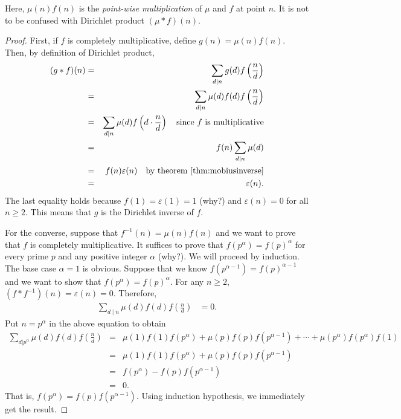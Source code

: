 \documentclass[12pt]{subfile}
\begin{document}
		\begin{note}
			Here, $\mu(n)f(n)$ is the \textit{point-wise multiplication} of $\mu$ and $f$ at point $n$. It is not to be confused with Dirichlet product $(\mu \ast f)(n)$.
		\end{note}

		\begin{proof}
			First, if $f$ is completely multiplicative, define $g(n) = \mu(n) f(n)$. Then, by definition of Dirichlet product,
				\begin{eqnarray*}
					(g \ast f)(n) &=& \sum_{d\mid n} g(d) f\left(\frac{n}{d}\right)\\
								  &=& \sum_{d\mid n} \mu(d) f(d) f\left(\frac{n}{d}\right)\\
								  &=& \sum_{d\mid n} \mu(d) f\left(d \cdot \frac{n}{d}\right) \quad \text{since } f \text{ is multiplicative}\\
								  &=& f(n) \sum_{d\mid n} \mu(d)\\
								  &=& f(n) \varepsilon(n) \quad \text{by theorem \ref{thm:mobiusinverse}}\\
								  &=& \varepsilon(n).
				\end{eqnarray*}
			The last equality holds because $f(1)=\varepsilon(1)=1$ (why?) and $\varepsilon(n)=0$ for all $n \geq 2$. This means that $g$ is the Dirichlet inverse of $f$.

			For the converse, suppose that $f^{-1}(n) = \mu(n) f(n)$ and we want to prove that $f$ is completely multiplicative. It suffices to prove that $f(p^\alpha)=f(p)^\alpha$ for every prime $p$ and any positive integer $\alpha$ (why?). We will proceed by induction. The base case $\alpha =1$ is obvious. Suppose that we know $f(p^{\alpha-1})=f(p)^{\alpha-1}$ and we want to show that $f(p^\alpha)=f(p)^\alpha$. For any $n \geq 2$, $(f\ast f^{-1})(n)=\varepsilon(n)=0$. Therefore,
				\begin{align*}
					\sum_{d\mid n} \mu(d) f(d) f\left(\frac{n}{d}\right) &= 0.
				\end{align*}
			Put $n=p^\alpha$ in the above equation to obtain
				\begin{eqnarray*}
					\sum_{d|p^\alpha} \mu(d) f(d) f\left(\frac{n}{d}\right)
						&=& \mu(1)f(1)f(p^\alpha) + \mu(p)f(p)f(p^{\alpha -1}) + \cdots +\mu(p^\alpha) f(p^\alpha)f(1)\\
						&=& \mu(1)f(1)f(p^\alpha) + \mu(p)f(p)f(p^{\alpha -1})\\
						&=& f(p^\alpha) - f(p) f(p^{\alpha -1}) \\
						&=& 0.
				\end{eqnarray*}
			That is, $f(p^\alpha) = f(p) f(p^{\alpha -1})$. Using induction hypothesis, we immediately get the result.
		\end{proof}
\end{document}
